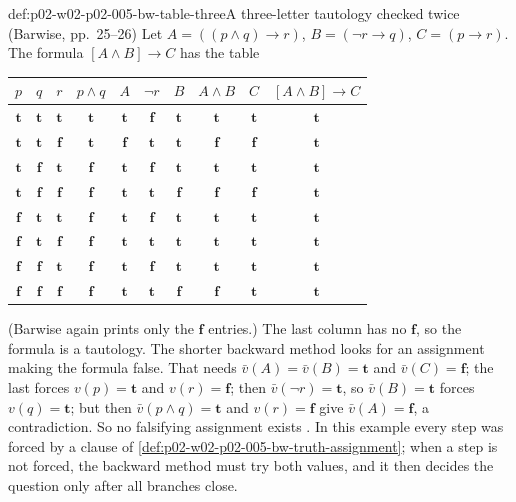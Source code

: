\begin{hbexample}{def:p02-w02-p02-005-bw-table-three}{A three-letter tautology checked twice (Barwise, pp.~25--26)}
Let \(A=((p\land q)\to r)\), \(B=(\neg r\to q)\), \(C=(p\to r)\).  The
formula \([A\land B]\to C\) has the table
\begin{center}
\begin{tabular}{ccc|cccccc|c}
\(p\) & \(q\) & \(r\) & \(p\land q\) & \(A\) & \(\neg r\) & \(B\) &
\(A\land B\) & \(C\) & \([A\land B]\to C\)\\
\hline
\(\mathbf t\)&\(\mathbf t\)&\(\mathbf t\)&\(\mathbf t\)&\(\mathbf t\)&\(\mathbf f\)&\(\mathbf t\)&\(\mathbf t\)&\(\mathbf t\)&\(\mathbf t\)\\
\(\mathbf t\)&\(\mathbf t\)&\(\mathbf f\)&\(\mathbf t\)&\(\mathbf f\)&\(\mathbf t\)&\(\mathbf t\)&\(\mathbf f\)&\(\mathbf f\)&\(\mathbf t\)\\
\(\mathbf t\)&\(\mathbf f\)&\(\mathbf t\)&\(\mathbf f\)&\(\mathbf t\)&\(\mathbf f\)&\(\mathbf t\)&\(\mathbf t\)&\(\mathbf t\)&\(\mathbf t\)\\
\(\mathbf t\)&\(\mathbf f\)&\(\mathbf f\)&\(\mathbf f\)&\(\mathbf t\)&\(\mathbf t\)&\(\mathbf f\)&\(\mathbf f\)&\(\mathbf f\)&\(\mathbf t\)\\
\(\mathbf f\)&\(\mathbf t\)&\(\mathbf t\)&\(\mathbf f\)&\(\mathbf t\)&\(\mathbf f\)&\(\mathbf t\)&\(\mathbf t\)&\(\mathbf t\)&\(\mathbf t\)\\
\(\mathbf f\)&\(\mathbf t\)&\(\mathbf f\)&\(\mathbf f\)&\(\mathbf t\)&\(\mathbf t\)&\(\mathbf t\)&\(\mathbf t\)&\(\mathbf t\)&\(\mathbf t\)\\
\(\mathbf f\)&\(\mathbf f\)&\(\mathbf t\)&\(\mathbf f\)&\(\mathbf t\)&\(\mathbf f\)&\(\mathbf t\)&\(\mathbf t\)&\(\mathbf t\)&\(\mathbf t\)\\
\(\mathbf f\)&\(\mathbf f\)&\(\mathbf f\)&\(\mathbf f\)&\(\mathbf t\)&\(\mathbf t\)&\(\mathbf f\)&\(\mathbf f\)&\(\mathbf t\)&\(\mathbf t\)
\end{tabular}
\end{center}
(Barwise again prints only the \(\mathbf f\) entries.)  The last column has
no \(\mathbf f\), so the formula is a tautology.  The shorter backward
method looks for an assignment making the formula false.  That needs
\(\bar v(A)=\bar v(B)=\mathbf t\) and \(\bar v(C)=\mathbf f\); the last
forces \(v(p)=\mathbf t\) and \(v(r)=\mathbf f\); then
\(\bar v(\neg r)=\mathbf t\), so \(\bar v(B)=\mathbf t\) forces
\(v(q)=\mathbf t\); but then \(\bar v(p\land q)=\mathbf t\) and
\(v(r)=\mathbf f\) give \(\bar v(A)=\mathbf f\), a contradiction.  So no
falsifying assignment exists \cite[ch.~A.1, \S4, pp.~25--26]{Barwise1977FirstOrder}.
In this example every step was forced by a clause of
\cref{def:p02-w02-p02-005-bw-truth-assignment}; when a step is not forced,
the backward method must try both values, and it then decides the question
only after all branches close.
\end{hbexample}

